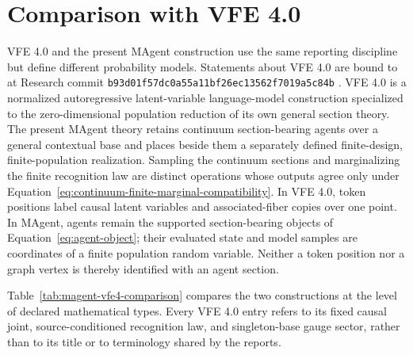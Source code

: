 \chapter{Comparison with VFE 4.0}
\label{ch:vfe4-comparison}

VFE 4.0 and the present MAgent construction use the same reporting discipline but define different probability models. Statements about VFE 4.0 are bound to  at Research commit \texttt{b93d01f57dc0a55a11bf26ec13562f7019a5c84b} \citep{Dennis2026VFE4Snapshot}. VFE 4.0 is a normalized autoregressive latent-variable language-model construction specialized to the zero-dimensional population reduction of its own general section theory. The present MAgent theory retains continuum section-bearing agents over a general contextual base and places beside them a separately defined finite-design, finite-population realization. Sampling the continuum sections and marginalizing the finite recognition law are distinct operations whose outputs agree only under Equation~\eqref{eq:continuum-finite-marginal-compatibility}. In VFE 4.0, token positions label causal latent variables and associated-fiber copies over one point. In MAgent, agents remain the supported section-bearing objects of Equation~\eqref{eq:agent-object}; their evaluated state and model samples are coordinates of a finite population random variable. Neither a token position nor a graph vertex is thereby identified with an agent section.

Table~\ref{tab:magent-vfe4-comparison} compares the two constructions at the level of declared mathematical types. Every VFE 4.0 entry refers to its fixed causal joint, source-conditioned recognition law, and singleton-base gauge sector, rather than to its title or to terminology shared by the reports.

